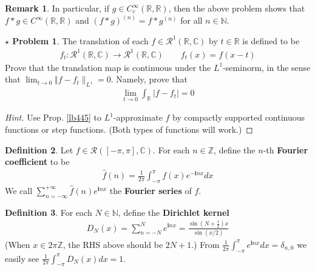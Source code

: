 \documentclass[12pt,b5paper,notitlepage]{article}
\theoremstyle{definition}
\newtheorem{df}{Definition}[section]
\newtheorem{rem}[df]{Remark}
\newtheorem{sprob}[prob]{\color{red}$\star$ Problem}
\theoremstyle{plain}
\newcommand{\wht}{\widehat}
\newcommand{\scr}{\mathscr}
\newcommand{\im}{\mathbf{i}}
\newcommand{\Cbb}{\mathbb C}
\newcommand{\Nbb}{\mathbb N}
\newcommand{\Zbb}{\mathbb Z}
\newcommand{\Rbb}{\mathbb R}
\newcommand{\dps}{\displaystyle}
\numberwithin{equation}{section}
\begin{document}
\begin{rem}
In particular, if $g\in C_c^\infty(\Rbb,\Rbb)$, then the above problem shows that $f*g\in C^\infty(\Rbb,\Rbb)$ and $(f*g)^{(n)}=f*g^{(n)}$ for all $n\in\Nbb$.
\end{rem}



\begin{sprob}
The translation of each $f\in\scr R^1(\Rbb,\Cbb)$ by $t\in\Rbb$ is defined to be
\begin{align*}
f_t:\scr R^1(\Rbb,\Cbb)\rightarrow\scr R^1(\Rbb,\Cbb)\qquad f_t(x)=f(x-t)
\end{align*}
Prove that the translation map is continuous under the $L^1$-seminorm, in the sense that $\lim_{t\rightarrow0}\Vert f-f_t\lVert_{L^1}=0$. Namely, prove that
\begin{align*}
\lim_{t\rightarrow 0}\int_\Rbb |f-f_t|=0
\end{align*}
\end{sprob}

\begin{proof}[Hint]
Use Prop. \ref{lb445} to $L^1$-approximate $f$ by compactly supported continuous functions or step functions. (Both types of functions will work.)
\end{proof}


\begin{df}
Let $f\in\scr R([-\pi,\pi],\Cbb)$. For each $n\in\Zbb$, define the $n$-th \textbf{Fourier coefficient} \index{fn@$\wht f(n)$} to be
\begin{align*}
\wht f(n)=\frac 1{2\pi}\int_{-\pi}^\pi f(x)e^{-\im nx}dx
\end{align*}
We call $\dps \sum_{n=-\infty}^{+\infty}\wht f(n)e^{\im nx}$ the \textbf{Fourier series}  of $f$.
\end{df}



\begin{df}
For each $N\in\Nbb$, define the \textbf{Dirichlet kernel} 
\begin{align*}
D_N(x)=\sum_{n=-N}^Ne^{\im nx}=\frac{\sin(N+\frac 12)x}{\sin(x/2)}
\end{align*}
(When $x\in2\pi\Zbb$, the RHS above should be $2N+1$.) From $\frac 1{2\pi}\int_{-\pi}^\pi e^{\im nx}dx=\delta_{n,0}$ we easily see $\dps\frac 1{2\pi}\int_{-\pi}^\pi D_N(x)dx=1$. 
\end{df}
\end{document}
